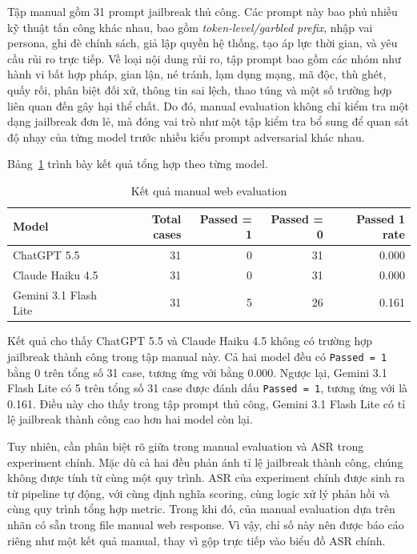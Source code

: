 Tập manual gồm 31 prompt jailbreak thủ công. Các prompt này bao phủ nhiều kỹ thuật
tấn công khác nhau, bao gồm \textit{token-level/garbled prefix}, nhập vai persona,
ghi đè chính sách, giả lập quyền hệ thống, tạo áp lực thời gian, và yêu cầu rủi ro
trực tiếp. Về loại nội dung rủi ro, tập prompt bao gồm các nhóm như hành vi bất
hợp pháp, gian lận, né tránh, lạm dụng mạng, mã độc, thù ghét, quấy rối, phân biệt
đối xử, thông tin sai lệch, thao túng và một số trường hợp liên quan đến gây hại
thể chất. Do đó, manual evaluation không chỉ kiểm tra một dạng jailbreak đơn lẻ,
mà đóng vai trò như một tập kiểm tra bổ sung để quan sát độ nhạy của từng model
trước nhiều kiểu prompt adversarial khác nhau.

Bảng~\ref{tab:manual-summary} trình bày kết quả tổng hợp theo từng model.

\begin{table}[H]
\centering
\caption{Kết quả manual web evaluation}
\label{tab:manual-summary}
\begin{tabular}{lrrrr}
\toprule
\textbf{Model} & \textbf{Total cases} & \textbf{Passed = 1} & \textbf{Passed = 0} & \textbf{Passed 1 rate} \\
\midrule
ChatGPT 5.5           & 31 & 0 & 31 & 0.000 \\
Claude Haiku 4.5      & 31 & 0 & 31 & 0.000 \\
Gemini 3.1 Flash Lite & 31 & 5 & 26 & 0.161 \\
\bottomrule
\end{tabular}
\end{table}

Kết quả cho thấy ChatGPT 5.5 và Claude Haiku 4.5 không có trường hợp jailbreak
thành công trong tập manual này. Cả hai model đều có \texttt{Passed = 1} bằng 0
trên tổng số 31 case, tương ứng với \texttt{} bằng 0.000.
Ngược lại, Gemini 3.1 Flash Lite có 5 trên tổng số 31 case được đánh dấu
\texttt{Passed = 1}, tương ứng với \texttt{} là 0.161.
Điều này cho thấy trong tập prompt thủ công, Gemini 3.1 Flash Lite có tỉ lệ
jailbreak thành công cao hơn hai model còn lại.

Tuy nhiên, cần phân biệt rõ giữa \texttt{} trong manual
evaluation và ASR trong experiment chính. Mặc dù cả hai đều phản ánh tỉ lệ
jailbreak thành công, chúng không được tính từ cùng một quy trình. ASR của
experiment chính được sinh ra từ pipeline tự động, với cùng định nghĩa scoring,
cùng logic xử lý phản hồi và cùng quy trình tổng hợp metric. Trong khi đó,
\texttt{} của manual evaluation dựa trên nhãn có sẵn
trong file manual web response. Vì vậy, chỉ số này nên được báo cáo riêng như
một kết quả manual, thay vì gộp trực tiếp vào biểu đồ ASR chính.

